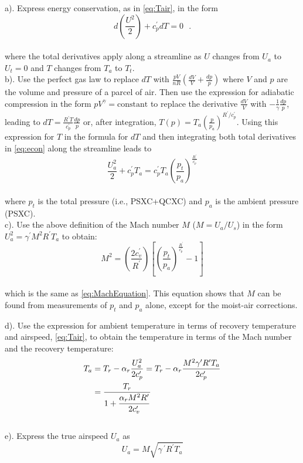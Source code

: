 \documentclass[
]{book}
\begin{document}
a). Express energy conservation, as in \eqref{eq:Tair}, in the form\\
\begin{equation}
d\left(\frac{U^{2}}{2}\right)+c_{p}^{\prime}dT=0\,\,\,\,.
\label{eq:econ}
\end{equation}\\
where the total derivatives apply along a streamline as \(U\) changes from \(U_a\) to \(U_t=0\) and \(T\) changes from \(T_a\) to \(T_t\).\\
b). Use the perfect gas law to replace \(dT\) with \(\frac{pV}{nR}(\frac{dV}{V}+\frac{dp}{p})\) where \(V\) and \(p\) are the volume and pressure of a parcel of air. Then use the expression for adiabatic compression in the form \(pV^\gamma = \mathrm{constant}\) to replace the derivative \(\frac{dV}{V}\) with \(-\frac{1}{\gamma}\frac{dp}{p}\), leading to \(dT=\frac{R^{\prime}T}{c_{p}^{\prime}}\frac{dp}{p}\) or, after integration, \(T(p)=T_{a}\left(\frac{p}{p_{a}}\right)^{R^{\prime}/c_{p}^{\prime}}\). Using this expression for \(T\) in the formula for \(dT\) and then integrating both total derivatives in \eqref{eq:econ} along the streamline leads to\\
\begin{equation}
\frac{U_{a}^{2}}{2}+c_{p}^{\prime}T_{a}=c_{p}^{\prime}T_{a}\left(\frac{p_{t}}{p_{a}}\right)^{\frac{R^{\prime}}{c_{p}^{\prime}}}
\label{eq:Ua2}
\end{equation}\\
where \(p_t\) is the total pressure (i.e., PSXC+QCXC) and
\(p_a\) is the ambient pressure (PSXC).\\
c). Use the above definition of the Mach number \(M\) (\(M=U_a/U_s\)) in the form
\(U_a^2=\gamma^\prime M^2 R^\prime T_a\) to obtain:\\
\begin{equation}
M^{2}=\left(\frac{2c_{v}^{\prime}}{R^{\prime}}\right)\left[\left(\frac{p_{t}}{p_{a}}\right)^{\frac{R^{\prime}}{c_{p}^{\prime}}}-1\right]
\label{eq:M2}
\end{equation}\\
which is the same as \eqref{eq:MachEquation}. This equation shows that \(M\) can be found from measurements of \(p_t\) and \(p_a\) alone, except for the moist-air corrections.

d). Use the expression for ambient temperature in terms of recovery temperature and airspeed, \eqref{eq:Tair}, to obtain the temperature in terms of the Mach number and the recovery temperature:\\
\begin{align}
T_{a} & = T_{r}-\alpha_{r}\frac{U_{a}^{2}}{2c_{p}^{\prime}}=T_{r}-\alpha_{r}\frac{M^{2}\gamma^{\prime}R^{\prime}T_{a}}{2c_{p}^{\prime}}\notag\\  
& = \frac{T_{r}}{1+\dfrac{\alpha_{r}M^{2}R^{\prime}}{2c_{v}^{\prime}}}  
\label{eq:TaEQ}
\end{align}
\\
e). Express the true airspeed \(U_a\) as\\
\begin{equation}
U_{a}=M\sqrt{\gamma\,^{\prime}R^{\prime}T_{a}}
\label{eq:UaFinal}
\end{equation}
\end{document}
